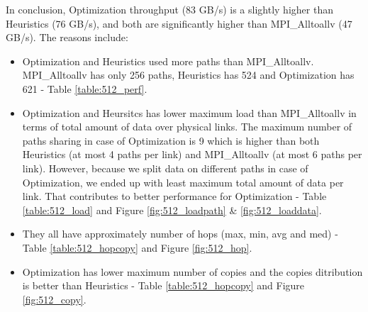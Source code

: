 \documentclass[letter]{article}
\begin{document}
In conclusion, Optimization throughput (83 GB/s) is a slightly higher than Heuristics (76 GB/s), and both are significantly higher than MPI\_Alltoallv (47 GB/s). The reasons include:
\begin{itemize}
\item Optimization and Heuristics used more paths than MPI\_Alltoallv. MPI\_Alltoallv has only 256 paths, Heuristics has 524 and Optimization has 621 - Table \ref{table:512_perf}.
\item Optimization and Heursitcs has lower maximum load than MPI\_Alltoallv in terms of total amount of data over physical links. The maximum number of paths sharing in case of Optimization is 9 which is higher than both Heuristics (at most 4 paths per link) and MPI\_Alltoallv (at most 6 paths per link). However, because we split data on different paths in case of Optimization, we ended up with least maximum total amount of data per link. That contributes to better performance for Optimization - Table \ref{table:512_load} and Figure \ref{fig:512_loadpath} \& \ref{fig:512_loaddata}.
\item They all have approximately number of hops (max, min, avg and med) - Table \ref{table:512_hopcopy} and Figure \ref{fig:512_hop}.
\item Optimization has lower maximum number of copies and the copies ditribution is better than Heuristics - Table \ref{table:512_hopcopy} and Figure \ref{fig:512_copy}.
\end{itemize}

\newpage


\end{document}

